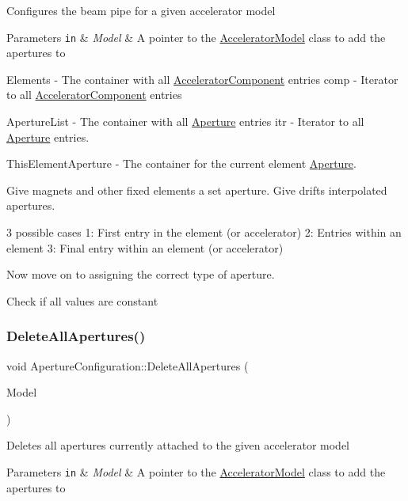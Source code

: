 Configures the beam pipe for a given accelerator model 
\begin{DoxyParams}[1]{Parameters}
\mbox{\tt in}  & {\em Model} & A pointer to the \hyperlink{classAcceleratorModel}{Accelerator\+Model} class to add the apertures to \\
\hline
\end{DoxyParams}
Elements -\/ The container with all \hyperlink{classAcceleratorComponent}{Accelerator\+Component} entries comp -\/ Iterator to all \hyperlink{classAcceleratorComponent}{Accelerator\+Component} entries

Aperture\+List -\/ The container with all \hyperlink{classAperture}{Aperture} entries itr -\/ Iterator to all \hyperlink{classAperture}{Aperture} entries.

This\+Element\+Aperture -\/ The container for the current element \hyperlink{classAperture}{Aperture}.

Give magnets and other fixed elements a set aperture. Give drifts interpolated apertures.

3 possible cases 1\+: First entry in the element (or accelerator) 2\+: Entries within an element 3\+: Final entry within an element (or accelerator)

Now move on to assigning the correct type of aperture.

Check if all values are constant\mbox{\label{classApertureConfiguration_a18b3907d726e2ef8731d6fe9a8a50ea4}} 
\subsubsection{\texorpdfstring{Delete\+All\+Apertures()}{DeleteAllApertures()}}
{\footnotesize\ttfamily void Aperture\+Configuration\+::\+Delete\+All\+Apertures (\begin{DoxyParamCaption}\item[{\hyperlink{classAcceleratorModel}{Accelerator\+Model} $\ast$}]{Model }\end{DoxyParamCaption})}

Deletes all apertures currently attached to the given accelerator model 
\begin{DoxyParams}[1]{Parameters}
\mbox{\tt in}  & {\em Model} & A pointer to the \hyperlink{classAcceleratorModel}{Accelerator\+Model} class to add the apertures to \\
\hline
\end{DoxyParams}
\mbox{\label{classApertureConfiguration_a24391451e6a25bc59ea448bdf06bb1b4}} 
